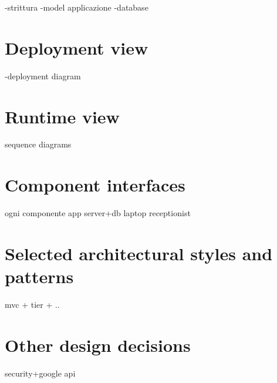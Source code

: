 -strittura
-model applicazione
-database


\section{Deployment view}
-deployment diagram

\section{Runtime view}
sequence diagrams

\section{Component interfaces}
ogni componente
app
server+db
laptop receptionist

\section{Selected architectural styles and patterns}
mvc + tier + ..

\section{Other design decisions}

security+google api

